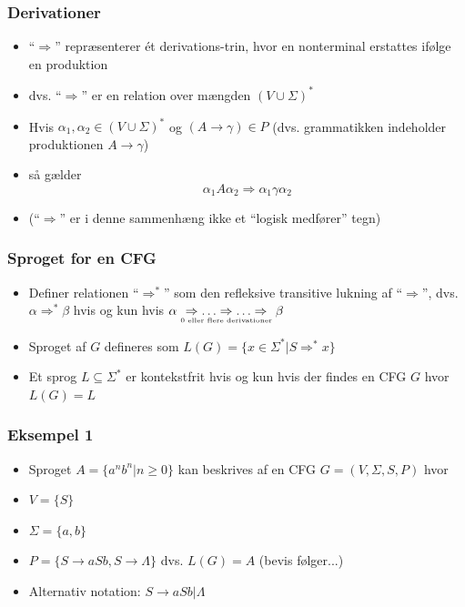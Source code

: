 \documentclass[handout]{beamer}
\begin{document}
\begin{frame}
\frametitle{Derivationer}

\begin{itemize}[<+->]
\item ``$\Rightarrow$'' repræsenterer ét derivations-trin, hvor 
      en nonterminal erstattes ifølge en produktion
    \item dvs. ``$\Rightarrow$'' er en relation over mængden $(V\cup \Sigma )^*$
    \item Hvis $\alpha_1,\alpha_2\in (V\cup \Sigma )^*$ og $(A \rightarrow  \gamma)\in P$
      (dvs. grammatikken indeholder produktionen  $A \rightarrow  \gamma$)
\item så gælder
        \[\alpha_1 A \alpha_2 \Rightarrow  \alpha_1\gamma\alpha_2\]

\item (``$\Rightarrow$'' er i denne sammenhæng ikke et “logisk medfører” tegn)
\end{itemize}
\end{frame}

\begin{frame}
\frametitle{Sproget for en CFG}
\begin{itemize}[<+->]
\item Definer relationen ``$\Rightarrow^*$'' som den refleksive  
transitive lukning af “$\Rightarrow$”, dvs. 
$\alpha \Rightarrow^* \beta$   hvis og kun hvis   $\alpha \underset{\text{\tiny{0 eller flere derivationer}}}{\Rightarrow \ldots \Rightarrow \ldots \Rightarrow} \beta$

\item  Sproget af $G$ defineres som 
$L(G) = \{ x\in\Sigma^*  |  S \Rightarrow^* x \} $
\item  Et sprog $L\subseteq\Sigma^*$ er kontekstfrit  
hvis og kun hvis  
der findes en CFG $G$ hvor $L(G)=L$ 
\end{itemize}
\end{frame}

\begin{frame}
\frametitle{Eksempel 1}
\begin{itemize}[<+->]
\item Sproget $A = \{ a^nb^n  | n\geq 0 \}$  kan beskrives 
af en CFG $G=(V,\Sigma,S,P)$ hvor 
\item $V = \{S\}$ 
\item $\Sigma = \{a,b\}$ 
\item $P = \{S \rightarrow aSb,  S \rightarrow \Lambda\}$ 
dvs. $L(G) = A$   (bevis følger...)
\item Alternativ notation: 
$S \rightarrow aSb | \Lambda$
\end{itemize}
\end{frame}
\end{document}
